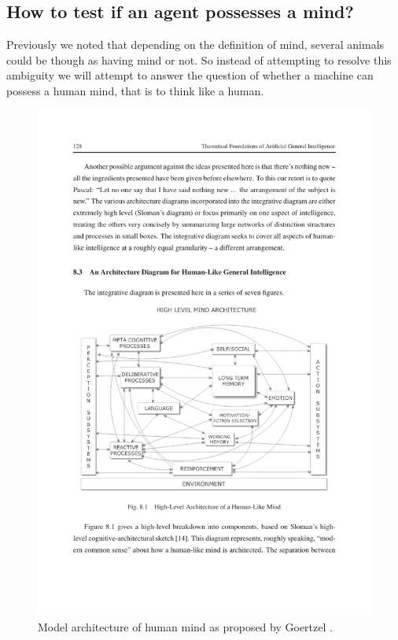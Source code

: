 \documentclass[11pt]{article}
\newenvironment{draft}{\color{dark-cornflower-blue-2}}{\ignorespacesafterend}
\begin{document}
\subsection{How to test if an agent possesses a mind?}

\begin{draft}
Previously we noted that depending on the definition of mind, several animals could be though as having mind or not. So instead of attempting to resolve this ambiguity we will attempt 
to answer the question of whether a machine can possess a human mind, that is to think like a human.

\begin{figure}
\centering
\includegraphics[scale=1.0]{mindStructure.pdf}
\caption{Model architecture of human mind as proposed by Goertzel \cite{goertzel2012agi}.}
\label{fig:mindArchi}
\end{figure}


\end{draft}
\end{document}
